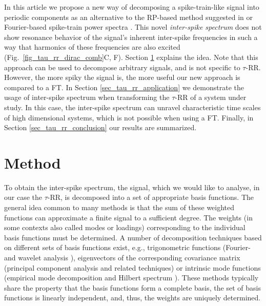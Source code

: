 \documentclass[entropy,article,submit,pdftex,moreauthors]{Definitions/mdpi}
\begin{document}
In this article we propose a new way of decomposing a spike-train-like signal into periodic components as 
an alternative to the RP-based method suggested in \cite{Zbilut2008} or Fourier-based spike-train power 
spectra \cite{Dummer2014}. This novel \textit{inter-spike spectrum} does not show resonance 
behavior of the signal's inherent inter-spike frequencies in such a way that harmonics of these frequencies are also excited (Fig.~\ref{fig_tau_rr_dirac_comb}C, F). Section \ref{sec_tau_rr_method} explains the idea. Note that this approach can be used to decompose arbitrary signals, and is not specific to $\tau$-RR. However, the more spiky the signal is, the more useful our new approach is compared to a 
FT. In Section \ref{sec_tau_rr_application} we demonstrate the usage of inter-spike spectrum when transforming the $\tau$-RR of a system under study. In this case, the inter-spike spectrum 
can unravel characteristic time scales of high dimensional systems, which is not possible when using a FT. Finally, in Section \ref{sec_tau_rr_conclusion} our results are summarized.


\section{Method}\label{sec_tau_rr_method}
    

To obtain the inter-spike spectrum, the signal, which we would like to analyse, in our case the $\tau$-RR, is decomposed into a set of appropriate basis functions. 
The general idea common to many methods is that the sum of these weighted functions can approximate a finite signal to a sufficient degree. The weights (in some contexts also called modes or loadings) corresponding to the individual basis functions must be determined.
A number of decomposition techniques based on different sets of basis functions exist, e.g., 
trigonometric functions (Fourier- and wavelet analysis \cite{Bracewell1986}), 
eigenvectors of the corresponding covariance matrix (principal component analysis \cite{Hotelling1933} and related techniques) 
or intrinsic mode functions (empirical mode decomposition and Hilbert spectrum \cite{Norden1998}).
These methods typically share the property that the basis functions form a complete basis,
the set of basis functions is linearly independent, and, thus, the weights are uniquely determined.
\end{document}
